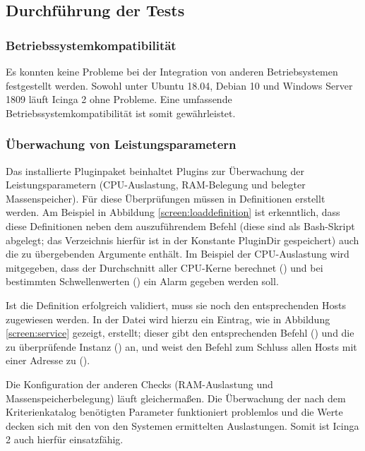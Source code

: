 \subsection{Durchführung der Tests}
\label{sec:DurchführungTests}

\subsubsection{Betriebssystemkompatibilität}
\label{sec:oscompatibility}
Es konnten keine Probleme bei der Integration von anderen Betriebsystemen festgestellt werden. Sowohl unter Ubuntu 18.04, Debian 10 und Windows Server 1809 läuft \glqq{}Icinga 2\grqq{} ohne Probleme. Eine umfassende Betriebssystemkompatibilität ist somit gewährleistet.

\subsubsection{Überwachung von Leistungsparametern}
\label{sec:ÜberwachungLeistungsparameter}
Das installierte Pluginpaket  beinhaltet Plugins zur Überwachung der Leistungsparametern (CPU-Auslastung, RAM-Belegung und belegter Massenspeicher). Für diese Überprüfungen müssen in  Definitionen erstellt werden. Am Beispiel in Abbildung \ref{screen:loaddefinition} ist erkenntlich, dass diese Definitionen neben dem auszuführendem Befehl (diese sind als Bash-Skript abgelegt; das Verzeichnis hierfür ist in der Konstante \glqq{}PluginDir\grqq{} gespeichert) auch die zu übergebenden Argumente enthält. Im Beispiel der CPU-Auslastung wird mitgegeben, dass der Durchschnitt aller CPU-Kerne berechnet () und bei bestimmten Schwellenwerten () ein Alarm gegeben werden soll.

Ist die Definition erfolgreich validiert, muss sie noch den entsprechenden Hosts zugewiesen werden. In der Datei  wird hierzu ein Eintrag, wie in Abbildung \ref{screen:service} gezeigt, erstellt; dieser gibt den entsprechenden Befehl () und die zu überprüfende Instanz () an, und weist den Befehl zum Schluss allen Hosts mit einer Adresse zu ().

Die Konfiguration der anderen Checks (RAM-Auslastung und Massenspeicherbelegung) läuft gleichermaßen. Die Überwachung der nach dem Kriterienkatalog benötigten Parameter funktioniert problemlos und die Werte decken sich mit den von den Systemen ermittelten Auslastungen. Somit ist \glqq{}Icinga 2\grqq{} auch hierfür einsatzfähig.

